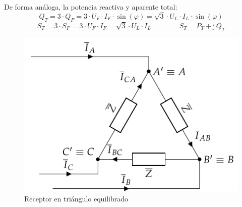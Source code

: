 	De forma análoga, la potencia reactiva y aparente total:
	\begin{equation}
	    \boxed{Q_T=3\cdot Q_F=3\cdot U_F\cdot {I_F}\cdot\sin(\varphi)=\sqrt{3}\cdot U_L\cdot I_L\cdot\sin(\varphi)}
	\end{equation}
	\begin{equation}
	    \boxed{S_T=3\cdot S_F=3\cdot U_F\cdot {I_F}=\sqrt{3}\cdot U_L\cdot I_L}  \qquad\qquad \boxed{\overline{S_T}=P_T+\mathrm{j}\,Q_T}
	\end{equation}
	
	\begin{figure}
	    \centering
	    \includegraphics{../figs/TrianguloEquilibrado_Receptor.pdf}
	    \caption{Receptor en triángulo equilibrado}
	    \label{fig:trianguloEquilibrado_receptor_potencia}
	\end{figure}
	
